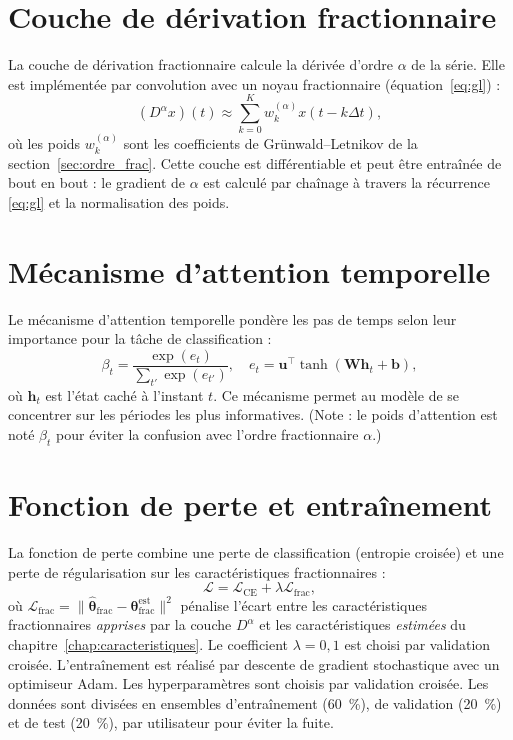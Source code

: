 \section{Couche de dérivation fractionnaire}
\label{sec:couche_frac}
La couche de dérivation fractionnaire calcule la dérivée d'ordre $\alpha$ de la série. Elle est implémentée par convolution avec un noyau fractionnaire (équation~\ref{eq:gl}) :
\begin{equation}
(D^\alpha x)(t) \approx \sum_{k=0}^{K} w_k^{(\alpha)} x(t - k \Delta t),
\end{equation}
où les poids $w_k^{(\alpha)}$ sont les coefficients de Grünwald--Letnikov de la section~\ref{sec:ordre_frac}. Cette couche est différentiable et peut être entraînée de bout en bout : le gradient de $\alpha$ est calculé par chaînage à travers la récurrence \eqref{eq:gl} et la normalisation des poids.

\section{Mécanisme d'attention temporelle}
\label{sec:attention}
Le mécanisme d'attention temporelle pondère les pas de temps selon leur importance pour la tâche de classification :
\begin{equation}
\beta_t = \frac{\exp(e_t)}{\sum_{t'} \exp(e_{t'})}, \quad e_t = \mathbf{u}^\top \tanh(\mathbf{W} \mathbf{h}_t + \mathbf{b}),
\end{equation}
où $\mathbf{h}_t$ est l'état caché à l'instant $t$. Ce mécanisme permet au modèle de se concentrer sur les périodes les plus informatives. (Note : le poids d'attention est noté $\beta_t$ pour éviter la confusion avec l'ordre fractionnaire $\alpha$.)

\section{Fonction de perte et entraînement}
\label{sec:perte}
La fonction de perte combine une perte de classification (entropie croisée) et une perte de régularisation sur les caractéristiques fractionnaires :
\begin{equation}
\mathcal{L} = \mathcal{L}_{\text{CE}} + \lambda \mathcal{L}_{\text{frac}},
\end{equation}
où $\mathcal{L}_{\text{frac}} = \|\hat{\boldsymbol{\theta}}_{\text{frac}} - \boldsymbol{\theta}_{\text{frac}}^{\text{est}}\|^2$ pénalise l'écart entre les caractéristiques fractionnaires \emph{apprises} par la couche $D^\alpha$ et les caractéristiques \emph{estimées} du chapitre~\ref{chap:caracteristiques}. Le coefficient $\lambda = 0{,}1$ est choisi par validation croisée. L'entraînement est réalisé par descente de gradient stochastique avec un optimiseur Adam. Les hyperparamètres sont choisis par validation croisée. Les données sont divisées en ensembles d'entraînement (60~\%), de validation (20~\%) et de test (20~\%), par utilisateur pour éviter la fuite.

